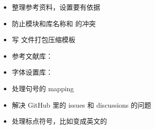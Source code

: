 \begin{itemize}[midpenalty=-1000,
  label=\protect\raisebox{-.3ex}{\NotDone}]
\begin{enumerate}
\begin{itemize}[midpenalty=-1000,
          label=\protect\raisebox{-.3ex}{\NotDone}]
          \item {}: 本科。参考最新的 2024 的本科模板。
          \item {}: 硕士
          \item {}: 博士
          \item {}: 数学与统计学院，兼容黄正华老师的模板配置。参考
            \begin{itemize}
              \item {}
              \item 黄正华老师的模板
            \end{itemize}
            子库：
            \begin{itemize}
              \item {}
              \item {}
              \item {}
            \end{itemize}
          \item {}: 计算机学院。参考 \href{https://github.com/cylqqqcyl/whu-thesis-2024}{cylqqqcyl 针对计算机学院改的模板}
          \item {}: 国家网络安全学院。参考网安用户上传的模板
        \end{itemize}
    \end{enumerate}
  \item 整理参考资料，设置要有依据
  \item[\Done] 防止模块和库名称和 \CusTeX 的冲突
  \item 写  文件打包压缩模板
  \item 参考文献库：
  \item 字体设置库：
  \item 处理句号的 mapping
  \item 解决  GitHub 里的 issues 和 discussions 的问题
  \item 处理标点符号，比如变成英文的
\end{itemize}